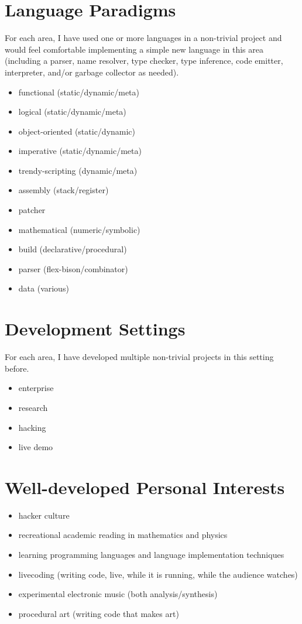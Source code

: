 \documentclass[12pt]{article}
\begin{document}
\section*{Language Paradigms}
For each area, I have used one or more languages in a non-trivial project and
would feel comfortable implementing a simple new language in this area
(including a parser, name resolver, type checker, type inference, code
emitter, interpreter, and/or garbage collector as needed).

\begin{itemize}
  \item functional (static/dynamic/meta) 
  \item logical (static/dynamic/meta)
  \item object-oriented (static/dynamic)
  \item imperative (static/dynamic/meta)
  \item trendy-scripting (dynamic/meta)
  \item assembly (stack/register)
  \item patcher
  \item mathematical (numeric/symbolic)
  \item build (declarative/procedural)
  \item parser (flex-bison/combinator)
  \item data (various)
\end{itemize}

\section*{Development Settings}
For each area, I have developed multiple non-trivial projects in this setting before.
\begin{itemize}
  \item enterprise
  \item research
  \item hacking
  \item live demo
\end{itemize}

\newpage
\section*{Well-developed Personal Interests}
\begin{itemize}
  \item hacker culture
  \item recreational academic reading in mathematics and physics 
  \item learning programming languages and language implementation techniques
  \item livecoding (writing code, live, while it is running, while the audience
watches)
  \item experimental electronic music (both analysis/synthesis)
  \item procedural art (writing code that makes art)
\end{itemize}
\end{document}
